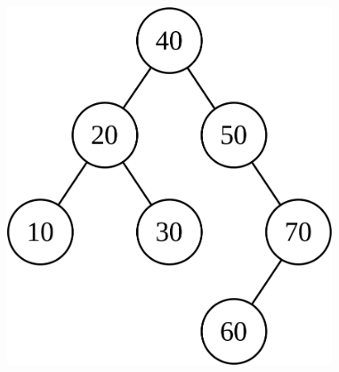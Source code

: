 \documentclass[aspectratio=169]{beamer}
\begin{document}
\begin{frame}
\begin{columns}[T]
\begin{column}{0.5\linewidth}
\begin{figure}[h]
\end{figure}
\end{column}
\begin{column}{0.5\linewidth}
\begin{figure}[h]
	\centering
	\includegraphics[height=0.5\paperheight]{imagens/avl03.png}\\~
\end{figure}
\end{column}
\end{columns}
\end{frame}
\end{document}
